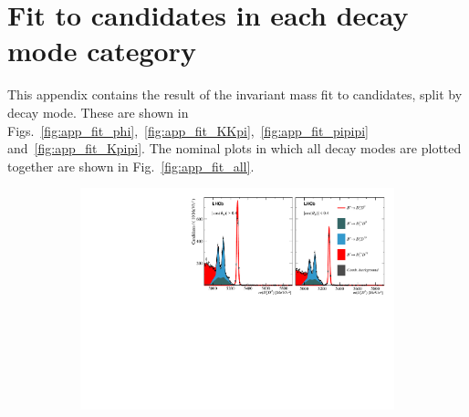 \chapter{Fit to \decay{\Bp}{\Dsp\phiz} candidates in each \Dsp decay mode category}
\label{ch:appendix_fits}

This appendix contains the result of the invariant mass fit to \decay{\Bp}{\Dsp\phiz} candidates, split by \Dsp decay mode. These are shown in Figs.~\ref{fig:app_fit_phi},~\ref{fig:app_fit_KKpi},~\ref{fig:app_fit_pipipi} and~\ref{fig:app_fit_Kpipi}.
The nominal plots in which all \Dsp decay modes are plotted together are shown in Fig.~\ref{fig:app_fit_all}.


\begin{figure}[!h]
    \centering
    \begin{subfigure}[t]{1.0\textwidth}
        \centering
        \includegraphics[width=1.0\textwidth]{figs/Appendix_FitCategories/canvas_DsD0_merged_both_summed_splitHel_splitKKPi_s21_s21r1_s24_s26.pdf}\\
    \end{subfigure}
    \begin{subfigure}[t]{1.0\textwidth}
        \centering

\end{subfigure}
\end{figure}
